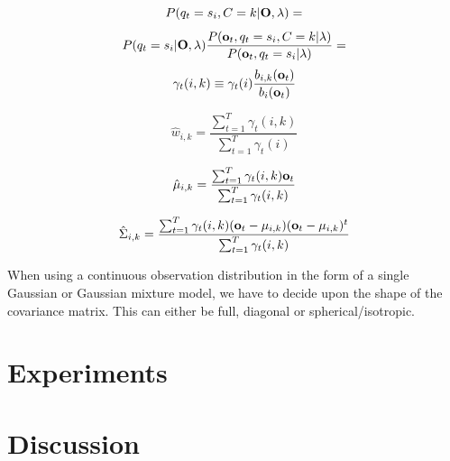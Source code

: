 \documentclass[conference]{IEEEtran}
\begin{document}
\[
  P(q_{t} = s_{i}, C = k | {\bf O}, \lambda) = 
\]
\[
 P(q_{t} = s_{i}| {\bf O}, \lambda ) \frac{P({\bf o}_{t},q_{t}=s_{i},C=k|\lambda )}{ P({\bf o}_{t}, q_{t} = s_{i}| \lambda) } = 
\]
\begin{equation}
 \gamma_{t}(i,k) \equiv \gamma_{t}(i) \frac{ b_{i,k}({\bf o}_{t}) } { b_{i}({\bf o}_{t}) }
\end{equation}


\begin{equation}
 \label{updateWeightGMM}
 \hat{w}_{i,k} = \displaystyle \frac{\sum_{t=1}^{T} \gamma_{t}(i,k) }{ \sum_{t=1}^{T} \gamma_{t}(i) }
\end{equation}

\begin{equation}
 \label{updateMeanGMM}
 \hat{\bf{\mu}}_{i,k} = \displaystyle \frac{ \sum_{t=1}^{T} \gamma_{t}(i,k) {\bf o}_{t} }{ \sum_{t=1}^{T} \gamma_{t}(i,k) }
\end{equation}

\begin{equation}
 \label{updateCovarianceGMM}
 \hat{\Sigma}_{i,k} = \displaystyle \frac{ \sum_{t=1}^{T} \gamma_{t}(i,k) ({\bf o}_{t} - {\bf \mu}_{i,k})( {\bf o}_{t} - {\bf \mu}_{i,k} )^{t} }{ \sum_{t=1}^{T} \gamma_{t}(i,k) }
\end{equation}

When using a continuous observation distribution in the form of a single Gaussian or Gaussian mixture model, we have to decide upon the shape of the covariance matrix. This can either be full, diagonal or spherical/isotropic. 

\section{Experiments}
\section{Discussion}
\end{document}
